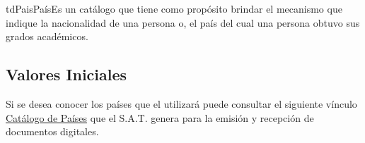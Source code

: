 	\begin{TipoDeDato}{tdPais}{País}{Es un catálogo que tiene como propósito brindar el mecanismo que indique la nacionalidad de una persona o, el país del cual una persona obtuvo sus grados académicos.}
		
		\begin{tdAtributos}
		\end{tdAtributos}
		
		\subsection{Valores Iniciales}
		
		Si se desea conocer los países que el  utilizará puede consultar el siguiente vínculo \href{http://www.sat.gob.mx/terceros_autorizados/receptor_doctos_electronicos/Documents/catalogos/Cat_Paises.pdf}{Catálogo de Países} que el S.A.T. genera  para la emisión y recepción de documentos digitales.
	\end{TipoDeDato}
	
